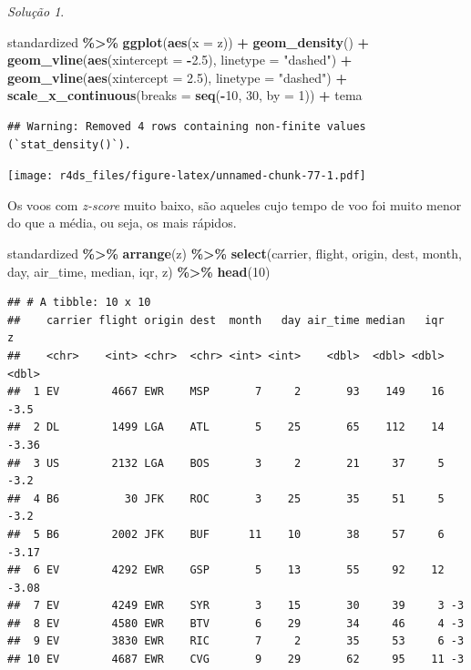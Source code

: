 \documentclass[
]{latex/krantz}
\newenvironment{Shaded}{\begin{snugshade}}{\end{snugshade}}
\newcommand{\AttributeTok}[1]{\textcolor[rgb]{0.13,0.29,0.53}{#1}}
\newcommand{\DecValTok}[1]{\textcolor[rgb]{0.00,0.00,0.81}{#1}}
\newcommand{\FloatTok}[1]{\textcolor[rgb]{0.00,0.00,0.81}{#1}}
\newcommand{\FunctionTok}[1]{\textcolor[rgb]{0.13,0.29,0.53}{\textbf{#1}}}
\newcommand{\NormalTok}[1]{#1}
\newcommand{\SpecialCharTok}[1]{\textcolor[rgb]{0.81,0.36,0.00}{\textbf{#1}}}
\newcommand{\StringTok}[1]{\textcolor[rgb]{0.31,0.60,0.02}{#1}}
\theoremstyle{definition}
\theoremstyle{definition}
\theoremstyle{definition}
\theoremstyle{definition}
\theoremstyle{remark}
\newtheorem*{solution}{Solução}
\begin{document}
\begin{solution}
\begin{Shaded}
\begin{Highlighting}[]
\NormalTok{standardized }\SpecialCharTok{\%\textgreater{}\%}    
    \FunctionTok{ggplot}\NormalTok{(}\FunctionTok{aes}\NormalTok{(}\AttributeTok{x =}\NormalTok{ z)) }\SpecialCharTok{+}
        \FunctionTok{geom\_density}\NormalTok{() }\SpecialCharTok{+}
        \FunctionTok{geom\_vline}\NormalTok{(}\FunctionTok{aes}\NormalTok{(}\AttributeTok{xintercept =} \SpecialCharTok{{-}}\FloatTok{2.5}\NormalTok{), }\AttributeTok{linetype =} \StringTok{"dashed"}\NormalTok{) }\SpecialCharTok{+}
        \FunctionTok{geom\_vline}\NormalTok{(}\FunctionTok{aes}\NormalTok{(}\AttributeTok{xintercept =} \FloatTok{2.5}\NormalTok{), }\AttributeTok{linetype =} \StringTok{"dashed"}\NormalTok{) }\SpecialCharTok{+}
        \FunctionTok{scale\_x\_continuous}\NormalTok{(}\AttributeTok{breaks =} \FunctionTok{seq}\NormalTok{(}\SpecialCharTok{{-}}\DecValTok{10}\NormalTok{, }\DecValTok{30}\NormalTok{, }\AttributeTok{by =} \DecValTok{1}\NormalTok{)) }\SpecialCharTok{+}
\NormalTok{        tema}
\end{Highlighting}
\end{Shaded}

\begin{verbatim}
## Warning: Removed 4 rows containing non-finite values (`stat_density()`).
\end{verbatim}

\texttt{[image: r4ds\_files/figure-latex/unnamed-chunk-77-1.pdf]}

Os voos com \emph{z-score} muito baixo, são aqueles cujo tempo de voo foi muito menor do que a média, ou seja, os mais rápidos.

\begin{Shaded}
\begin{Highlighting}[]
\NormalTok{standardized }\SpecialCharTok{\%\textgreater{}\%}
    \FunctionTok{arrange}\NormalTok{(z) }\SpecialCharTok{\%\textgreater{}\%}
    \FunctionTok{select}\NormalTok{(carrier, flight, origin, dest, month, day, air\_time, median, iqr, z) }\SpecialCharTok{\%\textgreater{}\%}
    \FunctionTok{head}\NormalTok{(}\DecValTok{10}\NormalTok{)}
\end{Highlighting}
\end{Shaded}

\begin{verbatim}
## # A tibble: 10 x 10
##    carrier flight origin dest  month   day air_time median   iqr     z
##    <chr>    <int> <chr>  <chr> <int> <int>    <dbl>  <dbl> <dbl> <dbl>
##  1 EV        4667 EWR    MSP       7     2       93    149    16 -3.5 
##  2 DL        1499 LGA    ATL       5    25       65    112    14 -3.36
##  3 US        2132 LGA    BOS       3     2       21     37     5 -3.2 
##  4 B6          30 JFK    ROC       3    25       35     51     5 -3.2 
##  5 B6        2002 JFK    BUF      11    10       38     57     6 -3.17
##  6 EV        4292 EWR    GSP       5    13       55     92    12 -3.08
##  7 EV        4249 EWR    SYR       3    15       30     39     3 -3   
##  8 EV        4580 EWR    BTV       6    29       34     46     4 -3   
##  9 EV        3830 EWR    RIC       7     2       35     53     6 -3   
## 10 EV        4687 EWR    CVG       9    29       62     95    11 -3
\end{verbatim}


\end{solution}
\end{document}
